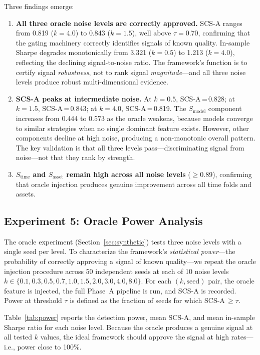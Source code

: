 \documentclass[12pt,a4paper]{article}
\begin{document}
Three findings emerge:

\begin{enumerate}
  \item \textbf{All three oracle noise levels are correctly approved.} SCS-A ranges from 0.819 ($k=4.0$) to 0.843 ($k=1.5$), well above $\tau=0.70$, confirming that the gating machinery correctly identifies signals of known quality. In-sample Sharpe degrades monotonically from 3.321 ($k=0.5$) to 1.213 ($k=4.0$), reflecting the declining signal-to-noise ratio. The framework's function is to certify signal \emph{robustness}, not to rank signal \emph{magnitude}---and all three noise levels produce robust multi-dimensional evidence.

  \item \textbf{SCS-A peaks at intermediate noise.} At $k=0.5$, SCS-A\,=\,0.828; at $k=1.5$, SCS-A\,=\,0.843; at $k=4.0$, SCS-A\,=\,0.819. The $S_{\text{model}}$ component increases from 0.444 to 0.573 as the oracle weakens, because models converge to similar strategies when no single dominant feature exists. However, other components decline at high noise, producing a non-monotonic overall pattern. The key validation is that all three levels pass---discriminating signal from noise---not that they rank by strength.

  \item \textbf{$S_{\text{time}}$ and $S_{\text{asset}}$ remain high across all noise levels} ($\geq$0.89), confirming that oracle injection produces genuine improvement across all time folds and assets.
\end{enumerate}


\subsection{Experiment 5: Oracle Power Analysis}
\label{sec:power}

The oracle experiment (Section~\ref{sec:synthetic}) tests three noise levels with a single seed per level. To characterize the framework's \emph{statistical power}---the probability of correctly approving a signal of known quality---we repeat the oracle injection procedure across 50 independent seeds at each of 10 noise levels $k \in \{0.1, 0.3, 0.5, 0.7, 1.0, 1.5, 2.0, 3.0, 4.0, 8.0\}$. For each $(k, \text{seed})$ pair, the oracle feature is injected, the full Phase~A pipeline is run, and SCS-A is recorded. Power at threshold $\tau$ is defined as the fraction of seeds for which SCS-A\,$\geq\tau$.

Table~\ref{tab:power} reports the detection power, mean SCS-A, and mean in-sample Sharpe ratio for each noise level. Because the oracle produces a genuine signal at all tested $k$ values, the ideal framework should approve the signal at high rates---i.e., power close to 100\%.
\end{document}
